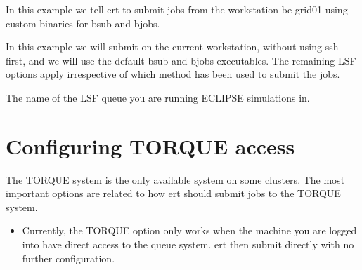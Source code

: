 \documentclass[letterpaper,10pt,english]{sphinxmanual}
\begin{document}
\begin{sphinxShadowBox}
%
\begin{sphinxVerbatim}[commandchars=\\\{\}]
    
          
           
\end{sphinxVerbatim}

In this example we tell ert to submit jobs from the workstation be-grid01
using custom binaries for bsub and bjobs.


%
\begin{sphinxVerbatim}[commandchars=\\\{\}]
   
\end{sphinxVerbatim}

In this example we will submit on the current workstation, without using ssh
first, and we will use the default bsub and bjobs executables. The remaining
LSF options apply irrespective of which method has been used to submit the
jobs.
\end{sphinxShadowBox}
\label{\detokenize{keywords/index:lsf-queue}}
\begin{sphinxShadowBox}

The name of the LSF queue you are running ECLIPSE simulations in.
\end{sphinxShadowBox}


\section{Configuring TORQUE access}
\label{\detokenize{keywords/index:configuring-torque-access}}\label{\detokenize{keywords/index:id14}}
The TORQUE system is the only available system on some clusters. The most
important options are related to how ert should submit jobs to the TORQUE
system.
\begin{itemize}
\item {} 
Currently, the TORQUE option only works when the machine you are logged into
have direct access to the queue system. ert then submit directly with no
further configuration.

\end{itemize}
\end{document}

